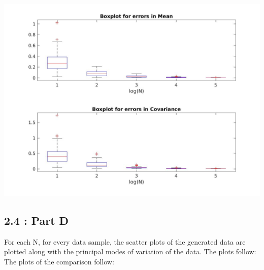 \documentclass[12pt, a4paper]{article}
\begin{document}
\includegraphics[width=\textwidth, height = 0.6\paperheight]{BoxPlots}


\newpage
\subsection*{2.4 : Part D}
For each N, for every data sample, the scatter plots of the generated data are plotted along with the principal modes of variation of the data. The plots follow: \\

 \noindent The plots of the comparison follow:
 
\end{document}
